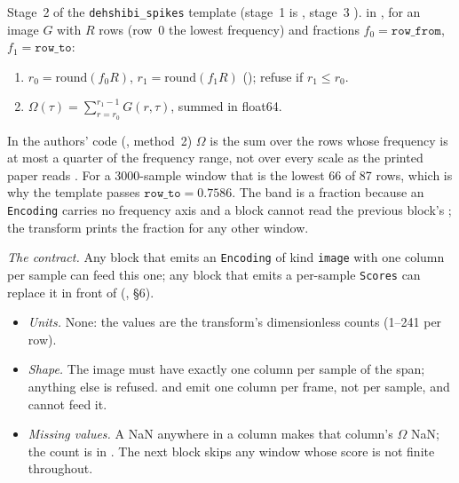 Stage~2 of the \texttt{dehshibi\_spikes} template (stage~1 is
, stage~3 ).
 in , for an image $G$ with $R$ rows
(row~0 the lowest frequency) and fractions $f_0 = \texttt{row\_from}$, $f_1 = \texttt{row\_to}$:
\begin{enumerate}
\item $r_0 = \mathrm{round}(f_0 R)$, $r_1 = \mathrm{round}(f_1 R)$ ();
  refuse if $r_1 \le r_0$.
\item $\Omega(\tau) = \sum_{r = r_0}^{r_1 - 1} G(r, \tau)$, summed in float64.
\end{enumerate}
In the authors' code (, method~2) $\Omega$ is the sum over the rows whose
frequency is at most a quarter of the frequency range, not over every scale as the printed paper
reads \citep{dehshibi2021electrical}. For a 3000-sample window that is the lowest 66 of 87 rows,
which is why the template passes $\texttt{row\_to} = 0.7586$. The band is a fraction because an
\texttt{Encoding} carries no frequency axis and a block cannot read the previous block's
; the transform prints the fraction for any other window.

\emph{The contract.} Any block that emits an \texttt{Encoding} of kind \texttt{image} with one
column per sample can feed this one; any block that emits a per-sample \texttt{Scores} can
replace it in front of 
(, \S6).

\begin{itemize}
\item \emph{Units.} None: the values are the transform's dimensionless counts (1--241 per row).
\item \emph{Shape.} The image must have exactly one column per sample of the span; anything
  else is refused.  and  emit
  one column per frame, not per sample, and cannot feed it.
\item \emph{Missing values.} A NaN anywhere in a column makes that column's $\Omega$ NaN; the
  count is in . The next block skips any window whose score is not finite
  throughout.
\end{itemize}

